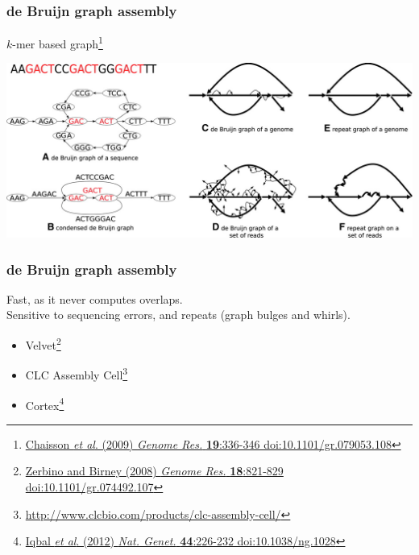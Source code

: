 \begin{frame}
  \frametitle{de Bruijn graph assembly}
  $k$-mer based graph\footnote{\tiny{\href{http://dx.doi.org/10.1101/gr.079053.108}{Chaisson \textit{et al}. (2009) \textit{Genome Res.} \textbf{19}:336-346 doi:10.1101/gr.079053.108}}}
  \begin{center}
    \includegraphics[width=1\textwidth]{images/de_bruijn_repeats}
  \end{center}  
\end{frame}

\begin{frame}
  \frametitle{de Bruijn graph assembly}
  Fast, as it never computes overlaps.\\[0.5cm]
  Sensitive to sequencing errors, and repeats (graph bulges and whirls).\\[0.5cm]
  \begin{itemize}
    \item Velvet\footnote{\tiny{\href{http://dx.doi.org/10.1101/gr.074492.107}{Zerbino and Birney (2008) \textit{Genome Res.} \textbf{18}:821-829 doi:10.1101/gr.074492.107}}}
    \item CLC Assembly Cell\footnote{\tiny{\href{http://www.clcbio.com/products/clc-assembly-cell/}{http://www.clcbio.com/products/clc-assembly-cell/}}}
    \item Cortex\footnote{\tiny{\href{http://dx.doi.org/10.1038/ng.1028}{Iqbal \textit{et al}. (2012) \textit{Nat. Genet.} \textbf{44}:226-232 doi:10.1038/ng.1028}}}
  \end{itemize}
\end{frame}

